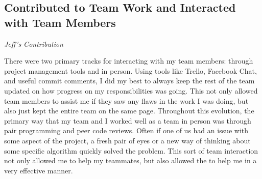 \documentclass[11pt]{article}
\begin{document}
\subsection{Contributed to Team Work and Interacted with Team Members}

\textit{Jeff's Contribution}

There were two primary tracks for interacting with my team members: through project management tools and in person.  Using tools like Trello, Facebook Chat, and useful commit comments, I did my best to always keep the rest of the team updated on how progress on my responsibilities was going.  This not only allowed team members to assist me if they saw any flaws in the work I was doing, but also just kept the entire team on the same page.  Throughout this evolution, the primary way that my team and I worked well as a team in person was through pair programming and peer code reviews.  Often if one of us had an issue with some aspect of the project, a fresh pair of eyes or a new way of thinking about some specific algorithm quickly solved the problem.  This sort of team interaction not only allowed me to help my teammates, but also allowed the to help me in a very effective manner.
\end{document}
